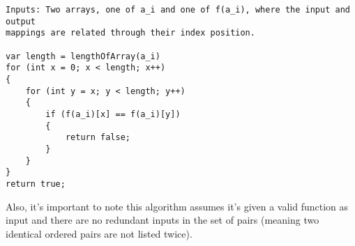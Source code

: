 \documentclass[11pt]{article}
\begin{document}
\begin{enumerate}
\begin{verbatim}
Inputs: Two arrays, one of a_i and one of f(a_i), where the input and output 
mappings are related through their index position.  

var length = lengthOfArray(a_i)
for (int x = 0; x < length; x++)
{
    for (int y = x; y < length; y++)
    {
        if (f(a_i)[x] == f(a_i)[y])
        {
            return false;
        }
    }
}
return true;
\end{verbatim}

Also, it's important to note this algorithm assumes it's given a valid function as input and there are no redundant inputs in the set of pairs (meaning two identical ordered pairs are not listed twice).  

\end{enumerate}
\end{document}
